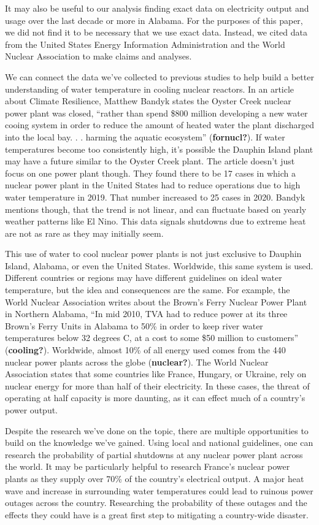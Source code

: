 \documentclass[
  letterpaper,
  DIV=11,
  numbers=noendperiod]{scrreprt}
\begin{document}
It may also be useful to our analysis finding exact data on electricity
output and usage over the last decade or more in Alabama. For the
purposes of this paper, we did not find it to be necessary that we use
exact data. Instead, we cited data from the United States Energy
Information Administration and the World Nuclear Association to make
claims and analyses.

We can connect the data we've collected to previous studies to help
build a better understanding of water temperature in cooling nuclear
reactors. In an article about Climate Resilience, Matthew Bandyk states
the Oyster Creek nuclear power plant was closed, ``rather than spend
\$800 million developing a new water cooing system in order to reduce
the amount of heated water the plant discharged into the local bay. . .
harming the aquatic ecosystem'' (\textbf{fornucl?}). If water
temperatures become too consistently high, it's possible the Dauphin
Island plant may have a future similar to the Oyster Creek plant. The
article doesn't just focus on one power plant though. They found there
to be 17 cases in which a nuclear power plant in the United States had
to reduce operations due to high water temperature in 2019. That number
increased to 25 cases in 2020. Bandyk mentions though, that the trend is
not linear, and can fluctuate based on yearly weather patterns like El
Nino. This data signals shutdowns due to extreme heat are not as rare as
they may initially seem.

This use of water to cool nuclear power plants is not just exclusive to
Dauphin Island, Alabama, or even the United States. Worldwide, this same
system is used. Different countries or regions may have different
guidelines on ideal water temperature, but the idea and consequences are
the same. For example, the World Nuclear Association writes about the
Brown's Ferry Nuclear Power Plant in Northern Alabama, ``In mid 2010,
TVA had to reduce power at its three Brown's Ferry Units in Alabama to
50\% in order to keep river water temperatures below 32 degrees C, at a
cost to some \$50 million to customers'' (\textbf{cooling?}). Worldwide,
almost 10\% of all energy used comes from the 440 nuclear power plants
across the globe (\textbf{nuclear?}). The World Nuclear Association
states that some countries like France, Hungary, or Ukraine, rely on
nuclear energy for more than half of their electricity. In these cases,
the threat of operating at half capacity is more daunting, as it can
effect much of a country's power output.

Despite the research we've done on the topic, there are multiple
opportunities to build on the knowledge we've gained. Using local and
national guidelines, one can research the probability of partial
shutdowns at any nuclear power plant across the world. It may be
particularly helpful to research France's nuclear power plants as they
supply over 70\% of the country's electrical output. A major heat wave
and increase in surrounding water temperatures could lead to ruinous
power outages across the country. Researching the probability of these
outages and the effects they could have is a great first step to
mitigating a country-wide disaster.
\end{document}
